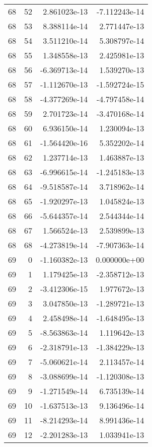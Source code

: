 \begin{tabular}{rrrr}
  68 &   52 &  2.861023e-13 & -7.112243e-14 \\
  68 &   53 &  8.388114e-14 &  2.771447e-13 \\
  68 &   54 &  3.511210e-14 &  5.308797e-14 \\
  68 &   55 &  1.348558e-13 &  2.425981e-13 \\
  68 &   56 & -6.369713e-14 &  1.539270e-13 \\
  68 &   57 & -1.112670e-13 & -1.592724e-15 \\
  68 &   58 & -4.377269e-14 & -4.797458e-14 \\
  68 &   59 &  2.701723e-14 & -3.470168e-14 \\
  68 &   60 &  6.936150e-14 &  1.230094e-13 \\
  68 &   61 & -1.564420e-16 &  5.352202e-14 \\
  68 &   62 &  1.237714e-13 &  1.463887e-13 \\
  68 &   63 & -6.996615e-14 & -1.245183e-13 \\
  68 &   64 & -9.518587e-14 &  3.718962e-14 \\
  68 &   65 & -1.920297e-13 &  1.045824e-13 \\
  68 &   66 & -5.644357e-14 &  2.544344e-14 \\
  68 &   67 &  1.566524e-13 &  2.539899e-13 \\
  68 &   68 & -4.273819e-14 & -7.907363e-14 \\
  69 &    0 & -1.160382e-13 &  0.000000e+00 \\
  69 &    1 &  1.179425e-13 & -2.358712e-13 \\
  69 &    2 & -3.412306e-15 &  1.977672e-13 \\
  69 &    3 &  3.047850e-13 & -1.289721e-13 \\
  69 &    4 &  2.458498e-14 & -1.648495e-13 \\
  69 &    5 & -8.563863e-14 &  1.119642e-13 \\
  69 &    6 & -2.318791e-13 & -1.384229e-13 \\
  69 &    7 & -5.060621e-14 &  2.113457e-14 \\
  69 &    8 & -3.088699e-14 & -1.120308e-13 \\
  69 &    9 & -1.271549e-14 &  6.735139e-14 \\
  69 &   10 & -1.637513e-13 &  9.136496e-14 \\
  69 &   11 & -8.214293e-14 &  8.991436e-14 \\
  69 &   12 & -2.201283e-13 &  1.033941e-13 \\

\end{tabular}
